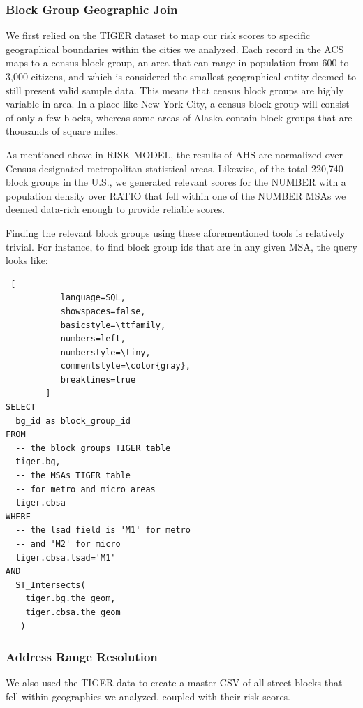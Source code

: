 \documentclass{sig-alternate}
\begin{document}
\subsubsection{Block Group Geographic Join}

We first relied on the TIGER dataset to map our risk scores to specific geographical boundaries within the cities we analyzed. Each record in the ACS maps to a census block group, an area that can range in population from 600 to 3,000 citizens, and which is considered the smallest geographical entity deemed to still present valid sample data. This means that census block groups are highly variable in area. In a place like New York City, a census block group will consist of only a few blocks, whereas some areas of Alaska contain block groups that are thousands of square miles.

As mentioned above in RISK MODEL, the results of AHS are normalized over Census-designated metropolitan statistical areas. Likewise, of the total 220,740 block groups in the U.S., we generated relevant scores for the NUMBER with a population density over RATIO that fell within one of the NUMBER MSAs we deemed data-rich enough to provide reliable scores.

Finding the relevant block groups using these aforementioned tools is relatively trivial. For instance, to find block group ids that are in any given MSA, the query looks like:

\begin{lstlisting} [
           language=SQL,
           showspaces=false,
           basicstyle=\ttfamily,
           numbers=left,
           numberstyle=\tiny,
           commentstyle=\color{gray},
           breaklines=true
        ]
SELECT 
  bg_id as block_group_id
FROM 
  -- the block groups TIGER table
  tiger.bg, 
  -- the MSAs TIGER table
  -- for metro and micro areas
  tiger.cbsa
WHERE 
  -- the lsad field is 'M1' for metro 
  -- and 'M2' for micro
  tiger.cbsa.lsad='M1'
AND
  ST_Intersects(
    tiger.bg.the_geom,
    tiger.cbsa.the_geom
   )
\end{lstlisting}

\subsubsection{Address Range Resolution}

We also used the TIGER data to create a master CSV of all street blocks that fell within geographies we analyzed, coupled with their risk scores.
\end{document}
